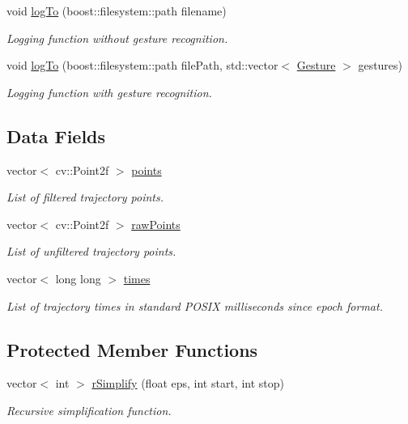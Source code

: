 \begin{DoxyCompactItemize}
void \hyperlink{classTrajectory_a7676429f8407e8404d245b551bccff1d}{log\-To} (boost\-::filesystem\-::path filename)
\begin{DoxyCompactList}\small\item\em \-Logging function without gesture recognition. \end{DoxyCompactList}\item 
void \hyperlink{classTrajectory_aa1434bbbb081952926d8ab0d33f16619}{log\-To} (boost\-::filesystem\-::path file\-Path, std\-::vector$<$ \hyperlink{classGesture}{\-Gesture} $>$ gestures)
\begin{DoxyCompactList}\small\item\em \-Logging function with gesture recognition. \end{DoxyCompactList}\end{DoxyCompactItemize}
\subsection*{\-Data \-Fields}
\begin{DoxyCompactItemize}
\item 
vector$<$ cv\-::\-Point2f $>$ \hyperlink{classTrajectory_a6c7123595ac7699ca6c03b558ac7486d}{points}
\begin{DoxyCompactList}\small\item\em \-List of filtered trajectory points. \end{DoxyCompactList}\item 
vector$<$ cv\-::\-Point2f $>$ \hyperlink{classTrajectory_a3540dcfb0974fa9314fecf94aed0b82b}{raw\-Points}
\begin{DoxyCompactList}\small\item\em \-List of unfiltered trajectory points. \end{DoxyCompactList}\item 
vector$<$ long long $>$ \hyperlink{classTrajectory_af4e494d9d3be73b8ba6fd476249d7ec1}{times}
\begin{DoxyCompactList}\small\item\em \-List of trajectory times in standard \-P\-O\-S\-I\-X milliseconds since epoch format. \end{DoxyCompactList}\end{DoxyCompactItemize}
\subsection*{\-Protected \-Member \-Functions}
\begin{DoxyCompactItemize}
\item 
vector$<$ int $>$ \hyperlink{classTrajectory_aa275338419559b93f779a8e6663b6735}{r\-Simplify} (float eps, int start, int stop)
\begin{DoxyCompactList}\small\item\em \-Recursive simplification function. \end{DoxyCompactList}\end{DoxyCompactItemize}
